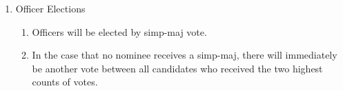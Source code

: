 \begin{enumerate}
		\item Officer Elections
		\begin{enumerate}
			\item Officers will be elected by \gls{simp-maj} vote.

			\item In the case that no nominee receives a \gls{simp-maj}, there will immediately be another vote between all candidates who received the two highest counts of votes.
		\end{enumerate}

	\end{enumerate}
